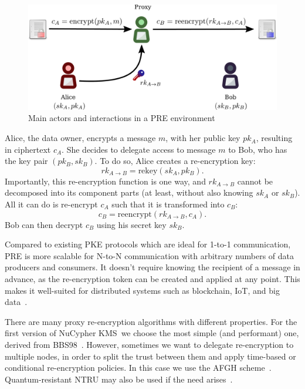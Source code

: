 \documentclass[longbibliography]{revtex4-1}
\newcommand{\kms}{NuCypher KMS}
\begin{document}
\begin{figure}
\centering
    \includegraphics[width=0.6\columnwidth]{pdf/pre.pdf}
    \caption{Main actors and interactions in a PRE environment}
    \label{fig:pre}
\end{figure}

Alice, the data owner, encrypts a message $m$, with her public key $pk_A$, resulting in ciphertext $c_A$.
She decides to delegate access to message $m$ to Bob, who has the key pair $(pk_B, sk_B)$.
To do so, Alice creates a re-encryption key:
\begin{equation}
    rk_{A\rightarrow B} = \text{rekey}(sk_A, pk_B).
\end{equation}
Importantly, this re-encryption function is one way, and $rk_{A\rightarrow B}$ cannot be decomposed into its component parts
(at least, without also knowing $sk_A$ or $sk_B$).
All it can do is re-encrypt $c_A$ such that it is transformed into $c_B$:
\begin{equation}
    c_B = \text{reencrypt}(rk_{A\rightarrow B}, c_{A}).
\end{equation}
Bob can then decrypt $c_{B}$ using his secret key $sk_{B}$.

Compared to existing PKE protocols which are ideal for 1-to-1 communication, PRE is more scalable for N-to-N communication
with arbitrary numbers of data producers and consumers.
It doesn't require knowing the recipient of a message in advance, as the re-encryption token can be created and applied at any point.
This makes it well-suited for distributed systems such as blockchain, IoT, and big data~\cite{web:nucypher-hadoop}.

There are many proxy re-encryption algorithms with different properties.
For the first version of \kms~we choose the most simple (and performant) one, derived from BBS98~\cite{BBS98}.
However, sometimes we want to delegate re-encryption to multiple nodes, in order to split the trust between them and apply time-based or conditional
re-encryption policies.
In this case we use the AFGH scheme~\cite{AFGH}.
Quantum-resistant NTRU may also be used if the need arises~\cite{wiki:ntru,ntrureencrypt}.
\end{document}
